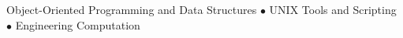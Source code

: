 
Object-Oriented Programming and Data Structures $\bullet$ UNIX Tools and Scripting $\bullet$ Engineering Computation

